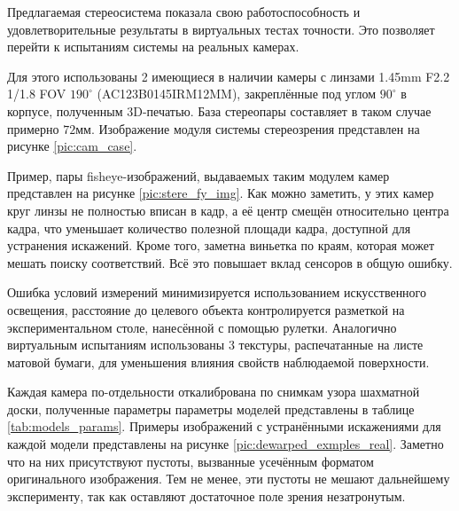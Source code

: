 
Предлагаемая стереосистема показала свою работоспособность и удовлетворительные результаты в виртуальных тестах 
точности. Это позволяет перейти к испытаниям системы на реальных камерах. 

Для этого использованы 2 имеющиеся в наличии камеры %
с линзами 1.45mm F2.2 1/1.8 FOV $190^\circ$ (AC123B0145IRM12MM), закреплённые под углом $90^\circ$ в корпусе,
полученным 3D-печатью. База стереопары составляет в таком случае примерно  $72мм$. Изображение модуля системы 
стереозрения представлен на рисунке \ref{pic:cam_case}. 

Пример, пары fisheye-изображений, выдаваемых таким модулем камер представлен на рисунке \ref{pic:stere_fy_img}. 
Как можно заметить, у этих камер круг линзы не полностью вписан в кадр, а её центр смещён относительно центра кадра,
 что уменьшает количество полезной площади кадра, доступной для устранения искажений. Кроме того, заметна виньетка 
по краям, которая может мешать поиску соответствий. Всё это повышает вклад сенсоров в общую ошибку. 




Ошибка условий измерений минимизируется использованием искусственного освещения, расстояние до целевого объекта
контролируется разметкой на экспериментальном столе, нанесённой с помощью рулетки. Аналогично виртуальным испытаниям 
использованы 3 текстуры, распечатанные на листе матовой бумаги, для уменьшения влияния свойств наблюдаемой поверхности.

Каждая камера по-отдельности откалибрована по снимкам узора шахматной доски, полученные параметры параметры моделей 
представлены в таблице \ref{tab:models_params}. Примеры изображений с устранёнными искажениями для каждой модели представлены на рисунке
 \ref{pic:dewarped_exmples_real}. Заметно что на них присутствуют пустоты, вызванные усечённым форматом оригинального 
 изображения. Тем не менее, эти пустоты не мешают дальнейшему эксперименту, так как оставляют достаточное поле зрения 
 незатронутым.


